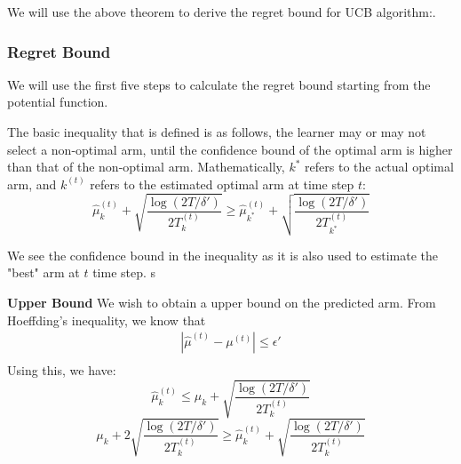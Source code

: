 \documentclass[11pt]{article}
\begin{document}
We will use the above theorem to derive the regret bound for UCB algorithm:.


\subsubsection{Regret Bound}
We will use the first five steps to calculate the regret bound starting from the potential function.


The basic inequality that is defined is as follows, the learner may or may not select a non-optimal arm, until the confidence bound of the optimal arm is higher than that of the non-optimal arm. Mathematically, $k^*$ refers to the actual optimal arm, and $k^{(t)}$ refers to the estimated optimal arm at time step $t$:
$$\hat{\mu}_k^{(t)} + \sqrt{\frac{\log(2T/\delta')}{2T_{k}^{(t)}}} \ge \hat{\mu}_{k^*}^{(t)} + \sqrt{\frac{\log(2T/\delta')}{2T_{k^*}^{(t)}}}$$

We see the confidence bound in the inequality as it is also used to estimate the "best" arm at $t$ time step. s

\textbf{Upper Bound} We wish to obtain a upper bound on the predicted arm. From Hoeffding's inequality, we know that \begin{align*}
    |\hat{\mu}^{(t)} - \mu^{(t)}| \le \epsilon' \\
\end{align*}  
Using this, we have: 
$$\hat{\mu}_k^{(t)} \le \mu_k + \sqrt{\frac{\log(2T/\delta')}{2T_{k}^{(t)}}}$$
$$\mu_k + 2\sqrt{\frac{\log(2T/\delta')}{2T_{k}^{(t)}}} \ge \hat{\mu}_k^{(t)} + \sqrt{\frac{\log(2T/\delta')}{2T_{k}^{(t)}}}$$
\end{document}
